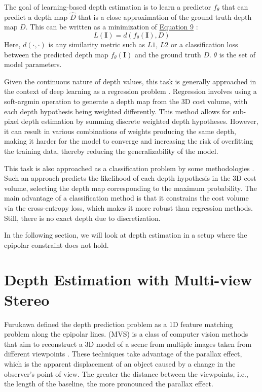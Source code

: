 The goal of learning-based {\mvs} depth estimation is to learn a predictor $f_\theta$ that can predict a depth map $\hat{D}$ that is a close approximation of the ground truth depth map $D$. This can be written as a minimization of \hyperref[eq:depth-loss]{Equation 9} \cite{Laga_2022}:
\begin{equation}
    L(\mathbf{I}) = d(f_{\theta}(\mathbf{I}), D) 
\end{equation}\label{eq:depth-loss}
Here, $d(\cdot,\cdot)$ is any similarity metric such as $L1$, $L2$ or a classification loss between the predicted depth map $f_{\theta}(\mathbf{I})$ and the ground truth $D$. ${\theta}$ is the set of model parameters. \par
Given the continuous nature of depth values, this task is generally approached in the context of deep learning as a regression problem \cite{Yao2018, cheng2020deep, Gu2020, Yang2020}. Regression involves using a soft-argmin operation to generate a depth map from the 3D cost volume, with each depth hypothesis being weighted differently. This method allows for sub-pixel depth estimation by summing discrete weighted depth hypotheses. However, it can result in various combinations of weights producing the same depth, making it harder for the model to converge and increasing the risk of overfitting the training data, thereby reducing the generalizability of the model.\par
This task is also approached as a classification problem by some methodologies \cite{Zhang2020, Yao2019}. Such an approach predicts the likelihood of each depth hypothesis in the 3D cost volume, selecting the depth map corresponding to the maximum probability. The main advantage of a classification method is that it constrains the cost volume via the cross-entropy loss, which makes it more robust than regression methods. Still, there is no exact depth due to discretization.\par
In the following section, we will look at depth estimation in a {\mvs} setup where the epipolar constraint does not hold. 


\section{Depth Estimation with Multi-view Stereo}\label{sec:multiviewster}

Furukawa {\etal} \cite{Furukawa2015} defined the depth prediction problem as a 1D feature matching problem along the epipolar lines. {\mvs} (MVS) is a class of computer vision methods that aim to reconstruct a 3D model of a scene from multiple images taken from different viewpoints \cite{Seitz2006}. These techniques take advantage of the parallax effect, which is the apparent displacement of an object caused by a change in the observer's point of view. The greater the distance between the viewpoints, i.e., the length of the baseline, the more pronounced the parallax effect.

